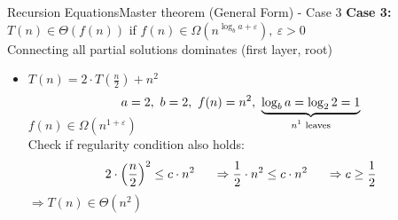\begin{frame}{Recursion Equations}{Master theorem (General Form) - Case 3}
  \textbf{Case 3:}
  {\color{Mittel-Gruen}$T(n) \in \Theta(f(n))$}
  \hfill if {\color{Mittel-Blau}
    $f(n) \in \Omega(n^{\log_b a+\varepsilon}), ~ \varepsilon > 0$
  }\\
  {\color{gray}Connecting all partial solutions dominates (first layer, root)}
  \vspace{1.0em}
  \begin{itemize}
    \item<3->
      $T(n) = 2 \cdot T(\tfrac{n}{2}) + n^2$
      \vspace{-0.5em}
      \begin{displaymath}
        a = 2, ~ b = 2, ~ f(n) = n^2, ~
        \smash{\underbrace{
          \log_b a = \log_2 2 = 1
        }_{\text{$n^1$ leaves}}}
      \end{displaymath}
      {\color{Mittel-Blau}$f(n) \in \Omega(n^{1+\varepsilon})$}\\[1.0em]
      Check if {\color{Mittel-Blau}regularity condition} also holds:\\
      \begin{displaymath}
        2 \cdot \left(\frac{n}{2}\right)^2 \leq c \cdot n^2
        \hspace{1.5em} \Rightarrow \frac{1}{2} \cdot n^2 \leq c \cdot n^2
        \hspace{1.5em} \Rightarrow c \geq \frac{1}{2}
      \end{displaymath}
      {\color{Mittel-Blau}$\Rightarrow T(n) \in \Theta(n^2)$}
  \end{itemize}
\end{frame}


